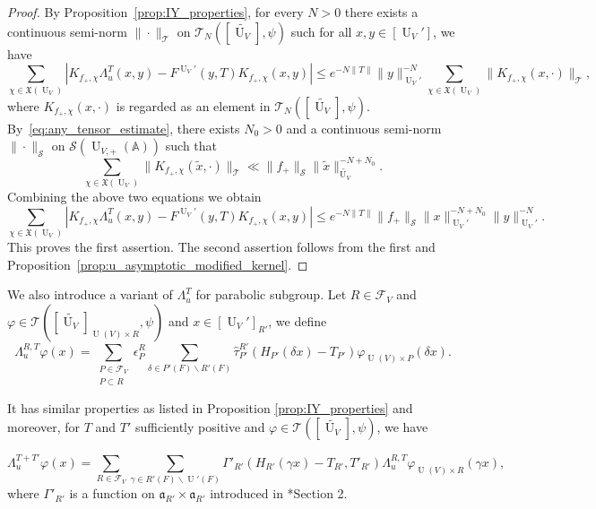 \documentclass[letterpaper,11pt]{amsart}
\newcommand{\fa}{\mathfrak{a}}
\newcommand{\fX}{\mathfrak{X}}
\newcommand{\bA}{\mathbb{A}}
\newcommand{\cF}{\mathcal{F}}
\newcommand{\cS}{\mathcal{S}}
\newcommand{\cT}{\mathcal{T}}
\newcommand{\<}{\negthickspace}
\DeclareMathOperator{\U}{U}
\theoremstyle{definition}
\theoremstyle{plain}
\theoremstyle{remark}
\numberwithin{equation}{section}
\begin{document}
\begin{proof}
By Proposition~\ref{prop:IY_properties}, for every $N>0$ there exists a
continuous semi-norm $\| \cdot \|_\cT$ on $\cT_N([\widetilde{\U_V}], \psi)$ such for all $x, y
\in [\U_V']$, we have
    \[
    \sum_{\chi \in \fX(\U_V)}
    \left| K_{f_+,\chi}\Lambda_u^T(x,y)
    - F^{\U_V'}(y,T)K_{f_+,\chi}(x,y) \right|
    \le  e^{-N\|T\|} \| y \|_{\U_V'}^{-N}
    \sum_{\chi \in \fX(\U_V)} \| K_{f_+,\chi}(x,\cdot)  \|_\cT,
    \]
where $K_{f_+,\chi}(x,\cdot)$ is regarded as an element in $\cT_N([\widetilde{\U_V}], \psi)$.
By~\eqref{eq:any_tensor_estimate}, there exists $N_0>0$ and a continuous
semi-norm $\| \cdot \|_\cS$ on $\cS(\U_{V, +}(\bA))$ such that
    \[
    \sum_{\chi \in \fX(\U_V)} \| K_{f_+,\chi}(\widetilde{x},\cdot) \|_\cT
    \ll \|f_+\|_{\cS} \|\widetilde{x}\|_{\widetilde{\U_V}}^{-N+N_0}.
    \]
Combining the above two equations we obtain
    \[
    \sum_{\chi \in \fX(\U_V)}
    \left| K_{f_+,\chi}\Lambda_u^T(x,y) - F^{\U_V'}(y,T)
    K_{f_+,\chi}(x,y) \right|
    \le e^{-N\|T\|} \|f_+\|_{\cS} \|x\|_{\U_V'}^{-N+N_0} \|y\|_{\U_V'}^{-N}.
    \]
This proves the first assertion. The second assertion follows from the first
and Proposition~\ref{prop:u_asymptotic_modified_kernel}.
\end{proof}

We also introduce a variant of $\Lambda_u^T$ for parabolic subgroup. Let $R \in \cF_V$ and $\varphi \in \cT([\widetilde{\U_V}]_{\U(V) \times R},\psi)$ and $x \in [\U_V']_{R'}$, we define
\begin{equation*}
    \Lambda^{R,T}_u \varphi(x) = \sum_{ \substack{P \in \cF_V \\ P \subset R}} \epsilon_P^R \sum_{\delta \in {P'(F) \backslash R'(F)}} \widehat{\tau}_{P'}^{R'}(H_{P'}(\delta x)-T_{P'}) \varphi_{\U(V) \times P}(\delta x).
\end{equation*}

It has similar properties as listed in Proposition \ref{prop:IY_properties} and moreover, for $T$ and $T'$ sufficiently positive and $\varphi \in \cT([\widetilde{\U_V}],\psi)$, we have

\begin{equation} 
    \Lambda^{T+T'}_{u}\varphi(x) = \sum_{R \in \cF_V} \sum_{\gamma \in R'(F) \backslash \U'(F)} \Gamma'_{R'}(H_{R'}(\gamma x)-T_{R'},T'_{R'}) \Lambda^{R,T}_u \varphi_{\U(V) \times R}(\gamma x),
\end{equation}
where $\Gamma'_{R'}$ is a function on $\fa_{R'} \times \fa_{R'}$ introduced in \cite{Arthur1}*{Section 2}.
\end{document}
